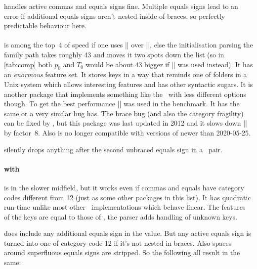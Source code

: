  handles active commas and equals signs fine. Multiple equals signs
lead to an error if additional equals signs aren't nested inside of braces, so
perfectly predictable behaviour here.

\paragraph{} is among the top~4 of speed if one uses |\pgfqkeys|
over |\pgfkeys|, else the initialisation parsing the family path takes roughly
\SI{43}{\ops} and moves it two spots down the list (so in \autoref{tab:comp}
both $p_0$ and $T_0$ would be about \SI{43}{\ops} bigger if
|| was used instead). It has an
\emph{enormous} feature set. It stores keys in a way that reminds one of folders
in a Unix system which allows interesting features and has other syntactic
sugars. It is another package that implements something like the \expnotation\
with less different options though. To get the best performance |\pgfqkeys| was
used in the benchmark. It has the same or a very similar bug \pkg{keyval} has.
The brace bug (and also the category fragility) can be fixed by ,
but this package was last updated in 2012 and it slows down |\pgfkeys| by
factor~\num{8}. Also \pkg{pgfkeyx} is no longer compatible with versions of
\pkg{pgfkeys} newer than 2020-05-25.

 silently drops anything after the second unbraced equals sign in a
\kv\ pair.

\paragraph{ with } is in the slower midfield,
but it works even if commas and equals have category codes different from 12
(just as some other packages in this list). It has quadratic run-time unlike
most other \kv\ implementations which behave linear. The features of the
keys are equal to those of \pkg{keyval}, the parser adds handling of unknown
keys.

 does include any additional equals sign in the value. But any
active equals sign is turned into one of category code 12 if it's not nested in
braces. Also spaces around superfluous equals signs are stripped. So the
following all result in the same:
\begin{enverb}[no-tcb,lst=belowskip=0pt]
  \kvsetkeys{foo}{bar=baz = morebaz}
\end{enverb}


